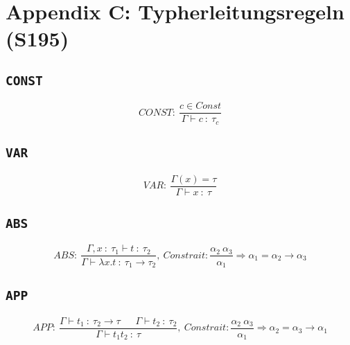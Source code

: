 \section{Appendix C: Typherleitungsregeln (S195)}

\subsection{\texttt{CONST}}
\[CONST:~\frac{c \in Const}{\Gamma \vdash c~:~\tau_c}\]

\subsection{\texttt{VAR}}
\[VAR:~\frac{\Gamma(x)=\tau}{\Gamma \vdash x~:~\tau}\]

\subsection{\texttt{ABS}}
\[ABS:~\frac{\Gamma,x~:~\tau_1 \vdash t~:~\tau_2}{\Gamma \vdash \lambda x.t~:~\tau_1 \rightarrow \tau_2},~Constrait: \frac{\alpha_2~\alpha_3}{\alpha_1} \Rightarrow \alpha_1 = \alpha_2 \rightarrow \alpha_3\]

\subsection{\texttt{APP}}
\[APP:~\frac{\Gamma \vdash t_1~:~\tau_2 \rightarrow \tau~~~~~~~\Gamma\vdash t_2~:~\tau_2}{\Gamma\vdash t_1t_2~:~\tau},~Constrait: \frac{\alpha_2~\alpha_3}{\alpha_1} \Rightarrow \alpha_2 = \alpha_3 \rightarrow \alpha_1\]



